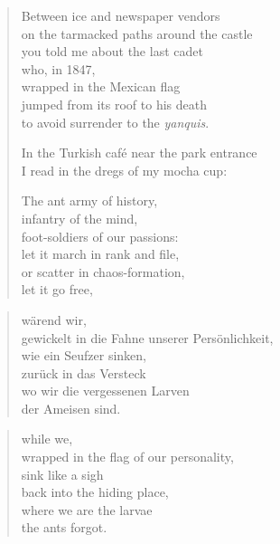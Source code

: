 {\begin{verse}
Between ice and newspaper vendors\\
on the tarmacked paths around the castle\\
you told me about the last cadet\\
who, in 1847,\\
wrapped in the Mexican flag\\
jumped from its roof to his death\\
to avoid surrender to the \emph{yanquis}.

In the Turkish café near the park entrance\\
I read in the dregs of my mocha cup:

The ant army of history,\\
infantry of the mind,\\
foot-soldiers of our passions:\\
let it march in rank and file,\\
or scatter in chaos-formation,\\
let it go free,

\end{verse}

\clearpage

\begin{verse}

wärend wir,\\
gewickelt in die Fahne unserer Persönlichkeit,\\
wie ein Seufzer sinken,\\
zurück in das Versteck\\
wo wir die vergessenen Larven\\
der Ameisen sind.

\end{verse}

\clearpage

\begin{verse}
while we,\\
wrapped in the flag of our personality,\\
sink like a sigh\\
back into the hiding place,\\
where we are the larvae\\
the ants forgot.

\end{verse}

}
